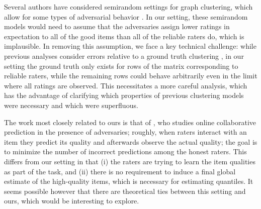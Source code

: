 Several authors have considered semirandom settings for graph clustering, which 
allow for some types of adversarial behavior \citep{feige2000finding,
feige2001heuristics,coja2004coloring,krivelevich2006semirandom,
coja2007solving,makarychev2012approximation,chen2014improved,guedon2014community,
moitra2015robust,agarwal2015multisection}. 
In our setting, these semirandom models would need to assume that the adversaries 
assign lower ratings in expectation to all of the good items than all of 
the reliable raters do, which is implausible. 
In removing this assumption, we face a key technical challenge: while previous 
analyses consider errors relative to a ground truth clustering 
\citep[e.g.][]{chen2014improved}, in our setting 
the ground truth only exists for rows of the matrix corresponding to reliable 
raters, while the remaining rows could behave arbitrarily even in the limit 
where all ratings are observed. This necessitates a more careful analysis, 
which has the advantage of clarifying which properties of previous clustering 
models were necessary and which were superfluous.

The work most closely related to ours is that of \citet{christiano2014provably,
christiano2016robust}, who studies online collaborative prediction in 
the presence of adversaries; roughly, when raters interact with an item 
they predict its quality and afterwards observe the actual quality; the 
goal is to minimize the number of incorrect 
predictions among the honest raters. This differs from our setting in that 
(i) the raters are trying to learn the item qualities as part of the task, 
and (ii) there is no requirement to induce a final global estimate of the 
high-quality items, which is necessary for estimating quantiles.
It seems possible however that there are theoretical ties between this 
setting and ours, which would be interesting to explore.
